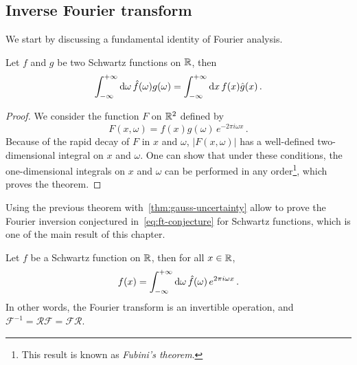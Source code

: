 \subsection{Inverse Fourier transform}
We start by discussing a fundamental identity of Fourier analysis.
\begin{theorem}
	\label{thm:fourier-adj}
	Let $f$ and $g$ be two Schwartz functions on $\mathbb{R}$, then
	\begin{equation}
		\int_{-\infty}^{+\infty}\mathrm{d}{\omega}\,\hat{f}(\omega)g(\omega)=\int_{-\infty}^{+\infty}\mathrm{d}{x}\,f(x)\hat{g}(x)\,.
	\end{equation}
\end{theorem}
\begin{proof}
	We consider the function $F$ on $\mathbb{R}^2$ defined by
	\begin{equation}
		F(x,\omega)=f(x)g(\omega)\,e^{-2\pi i\omega x}\,.
	\end{equation}
	Because of the rapid decay of $F$ in $x$ and $\omega$, $|F(x,\omega)|$ has a
	well-defined two-dimensional integral on $x$ and $\omega$. One can show that under these
	conditions, the one-dimensional integrals on $x$ and $\omega$ can be performed in any
	order\footnote{This result is known as \emph{Fubini's theorem}.}, which proves the
	theorem.
\end{proof}
Using the previous theorem with~\cref{thm:gauss-uncertainty} allow to prove the Fourier
inversion conjectured in~\cref{eq:ft-conjecture} for Schwartz functions, which is one of
the main result of this chapter.
\begin{theorem}
	\label{thm:fourier-inv}
	Let $f$ be a Schwartz function on $\mathbb{R}$, then for all $x\in\mathbb{R}$,
	\begin{equation}
		f(x)=\int_{-\infty}^{+\infty}\mathrm{d}{\omega}\,\hat{f}(\omega)\,e^{2\pi i\omega x}\,.
	\end{equation}
	In other words, the Fourier transform is an invertible operation, and
	$\mathcal{F}^{-1}=\mathcal{R}\mathcal{F}=\mathcal{F}\mathcal{R}$.
\end{theorem}
